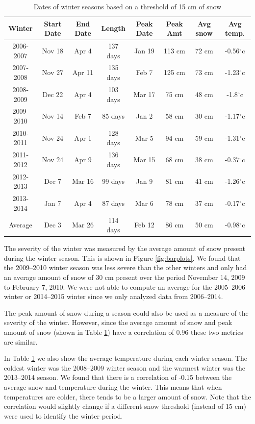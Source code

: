 \documentclass[12pt,twoside]{article}
\begin{document}
{%
\begin{table}[ht]
\centering
{\small
\begin{tabular}{cccccccc}
  \hline
Winter & Start Date & End Date & Length & Peak Date & Peak Amt & Avg snow & Avg temp. \\ 
  \hline
2006-2007 & Nov 18 & Apr 4 & 137 days & Jan 19 & 113 cm & 72 cm & -0.56$^{\circ}$c \\ 
  2007-2008 & Nov 27 & Apr 11 & 135 days & Feb 7 & 125 cm & 73 cm & -1.23$^{\circ}$c \\ 
  2008-2009 & Dec 22 & Apr 4 & 103 days & Mar 17 & 75 cm & 48 cm & -1.8$^{\circ}$c \\ 
  2009-2010 & Nov 14 & Feb 7 & 85 days & Jan 2 & 58 cm & 30 cm & -1.17$^{\circ}$c \\ 
  2010-2011 & Nov 24 & Apr 1 & 128 days & Mar 5 & 94 cm & 59 cm & -1.31$^{\circ}$c \\ 
  2011-2012 & Nov 24 & Apr 9 & 136 days & Mar 15 & 68 cm & 38 cm & -0.37$^{\circ}$c \\ 
  2012-2013 & Dec 7 & Mar 16 & 99 days & Jan 9 & 81 cm & 41 cm & -1.26$^{\circ}$c \\ 
  2013-2014 & Jan 7 & Apr 4 & 87 days & Mar 6 & 78 cm & 37 cm & -0.17$^{\circ}$c \\ 
  Average & Dec 3 & Mar 26 & 114 days & Feb 12 & 86 cm & 50 cm & -0.98$^{\circ}$c \\ 
   \hline
\end{tabular}
}
\caption{Dates of winter seasons based on a threshold of 15 cm of snow} 
\label{tab:summarytable}
\end{table}
\medskip
The severity of the winter was measured by the average amount of snow present during the winter season. This is shown in Figure \ref{fig:barplots}. We found that the 2009--2010 winter season was less severe than the other winters and only had an average amount of snow of 30 cm present over the period November 14, 2009 to February 7, 2010. We were not able to compute an average for the 2005--2006 winter or 2014--2015 winter since we only analyzed data from 2006--2014. 


The peak amount of snow during a season could also be used as a measure of the severity of the winter. However, since the average amount of snow and peak amount of snow (shown in Table \ref{tab:summarytable}) have a correlation of 0.96 these two metrics are similar.


In Table \ref{tab:summarytable} we also show the average temperature during each winter season. The coldest winter was the 2008--2009 winter season and the warmest winter was the 2013--2014 season. We found that there is a correlation of -0.15 between the average snow and temperature during the winter. This means that when temperatures are colder, there tends to be a larger amount of snow. Note that the correlation would slightly change if a different snow threshold (instead of 15 cm) were used to identify the winter period.

}
\end{document}
